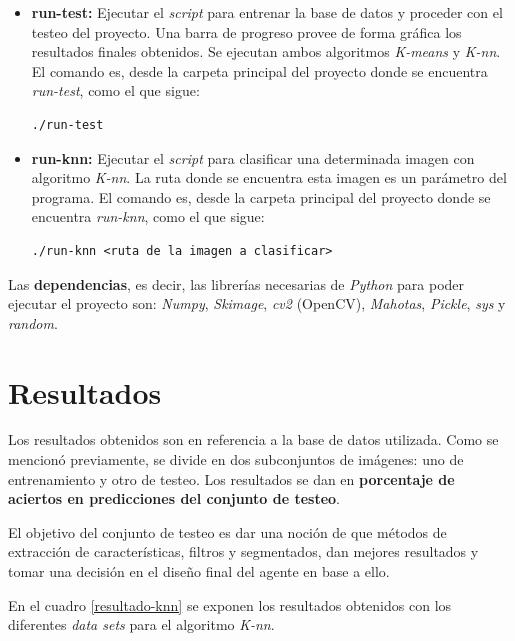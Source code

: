\documentclass[10pt,a4paper]{article}
\begin{document}
\begin{itemize}
\item \textbf{run-test:} Ejecutar el \textit{script} para entrenar la base de datos y proceder con el testeo del proyecto. Una barra de progreso provee de forma gráfica los resultados finales obtenidos. Se ejecutan ambos algoritmos \textit{K-means} y \textit{K-nn}. El comando es, desde la carpeta principal del proyecto donde se encuentra \textit{run-test}, como el que sigue:
\begin{verbatim}
./run-test
\end{verbatim}
\item \textbf{run-knn:} Ejecutar el \textit{script} para clasificar una determinada imagen con algoritmo \textit{K-nn}. La ruta donde se encuentra esta imagen es un parámetro del programa. El comando es, desde la carpeta principal del proyecto donde se encuentra \textit{run-knn}, como el que sigue:
\begin{verbatim}
./run-knn <ruta de la imagen a clasificar>
\end{verbatim}
\end{itemize}

Las \textbf{dependencias}, es decir, las librerías necesarias de \textit{Python} para poder ejecutar el proyecto son: \textit{Numpy}, \textit{Skimage}, \textit{cv2} (OpenCV), \textit{Mahotas}, \textit{Pickle}, \textit{sys} y \textit{random}.

\section{Resultados\label{resultados}}
Los resultados obtenidos son en referencia a la base de datos utilizada. Como se mencionó previamente, se divide en dos subconjuntos de imágenes: uno de entrenamiento y otro de testeo. Los resultados se dan en \textbf{porcentaje de aciertos en predicciones del conjunto de testeo}.

El objetivo del conjunto de testeo es dar una noción de que métodos de extracción de características, filtros y segmentados, dan mejores resultados y tomar una decisión en el diseño final del agente en base a ello. 

En el cuadro \ref{resultado-knn} se exponen los resultados obtenidos con los diferentes \textit{data sets} para el algoritmo \textit{K-nn}.
\end{document}
